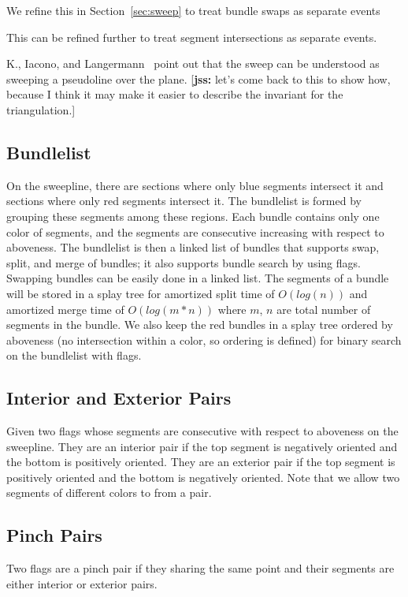 \documentclass[11pt]{article}
\def\jss#1{{\footnotesize [{\bf jss:} #1]}}
\begin{document}
We refine this in Section~\ref{sec:sweep} to treat bundle swaps as separate events

This can be refined further to treat segment intersections as separate events. 

K., Iacono, and Langermann~\cite{}  point out that the sweep can be understood as sweeping a pseudoline over the plane.  \jss{let's come back to this to show how, because I think it may make it easier to describe the invariant for the triangulation.}

\subsection{Bundlelist}
On the sweepline, there are sections where only blue segments intersect it and sections where only red segments intersect it. 
The bundlelist is formed by grouping these segments among these regions.
Each bundle contains only one color of segments, and the segments are consecutive increasing with respect to aboveness.
The bundlelist is then a linked list of bundles that supports swap, split, and merge of bundles; it also supports bundle search by using flags.
Swapping bundles can be easily done in a linked list.
The segments of a bundle will be stored in a splay tree for amortized split time of $O(log(n))$ and amortized merge time of $O(log(m*n))$ where $m$, $n$ are total number of segments in the bundle.
We also keep the red bundles in a splay tree ordered by aboveness (no intersection within a color, so ordering is defined) for binary search on the bundlelist with flags.

\subsection{Interior and Exterior Pairs}
Given two flags whose segments are consecutive with respect to aboveness on the sweepline.
They are an interior pair if the top segment is negatively oriented and the bottom is positively oriented.
They are an exterior pair if the top segment is positively oriented and the bottom is negatively oriented.
Note that we allow two segments of different colors to from a pair.

\subsection{Pinch Pairs}
Two flags are a pinch pair if they sharing the same point and their segments are either interior or exterior pairs.
\end{document}
